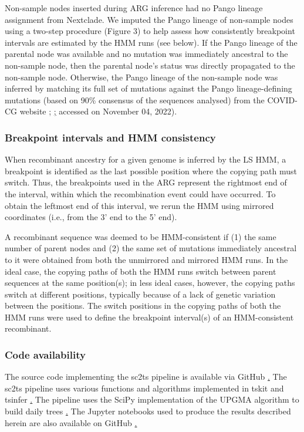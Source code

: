 \documentclass{article}
\begin{document}
Non-sample nodes inserted during ARG inference had no Pango lineage assignment from Nextclade. We imputed the Pango lineage of non-sample nodes using a two-step procedure (Figure 3) to help assess how consistently breakpoint intervals are estimated by the HMM runs (see below). If the Pango lineage of the parental node was available and no mutation was immediately ancestral to the non-sample node, then the parental node’s status was directly propagated to the non-sample node. Otherwise, the Pango lineage of the non-sample node was inferred by matching its full set of mutations against the Pango lineage-defining mutations (based on 90\% consensus of the sequences analysed) from the COVID-CG website \cite{Chen2021-zc}; \href{https://covidcg.org/}; accessed on November 04, 2022).

\subsubsection{Breakpoint intervals and HMM consistency}

When recombinant ancestry for a given genome is inferred by the LS HMM, a breakpoint is identified as the last possible position where the copying path must switch. Thus, the breakpoints used in the ARG represent the rightmost end of the interval, within which the recombination event could have occurred. To obtain the leftmost end of this interval, we rerun the HMM using mirrored coordinates (i.e., from the 3’ end to the 5’ end).

A recombinant sequence was deemed to be HMM-consistent if (1) the same number of parent nodes and (2) the same set of mutations immediately ancestral to it were obtained from both the unmirrored and mirrored HMM runs. In the ideal case, the copying paths of both the HMM runs switch between parent sequences at the same position(s); in less ideal cases, however, the copying paths switch at different positions, typically because of a lack of genetic variation between the positions. The switch positions in the copying paths of both the HMM runs were used to define the breakpoint interval(s) of an HMM-consistent recombinant.

\subsubsection{Code availability}

The source code implementing the sc2ts pipeline is available via GitHub \href{https://github.com/jeromekelleher/sc2ts/}. The sc2ts pipeline uses various functions and algorithms implemented in tskit and tsinfer \href{https://github.com/tskit-dev/}. The pipeline uses the SciPy implementation of the UPGMA algorithm to build daily trees \href{https://docs.scipy.org/doc/scipy/reference/generated/scipy.cluster.hierarchy.average.html}. The Jupyter notebooks used to produce the results described herein are also available on GitHub \href{https://github.com/jeromekelleher/sc2ts-paper/}.
\end{document}
